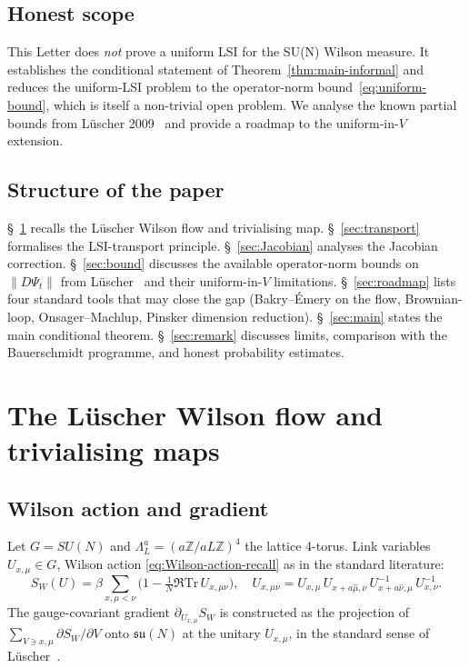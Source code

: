\documentclass[11pt,a4paper]{amsart}
\theoremstyle{definition}
\newcommand{\Z}{\mathbb{Z}}
\newcommand{\su}{\mathfrak{su}}
\newcommand{\norm}[1]{\left\lVert#1\right\rVert}
\newcommand{\Tr}{\mathrm{Tr}}
\begin{document}
\subsection{Honest scope}
\label{sec:scope}
This Letter does \emph{not} prove a uniform LSI for the SU(N) Wilson
measure. It establishes the conditional statement of
Theorem~\ref{thm:main-informal} and reduces the uniform-LSI problem to
the operator-norm bound~\eqref{eq:uniform-bound}, which is itself a
non-trivial open problem. We analyse the known partial bounds from
L\"uscher 2009~\cite{Luscher2009TrivializingMaps} and provide a roadmap
to the uniform-in-$V$ extension.

\subsection{Structure of the paper}
\S~\ref{sec:luescher} recalls the L\"uscher Wilson flow and trivialising
map. \S~\ref{sec:transport} formalises the LSI-transport principle.
\S~\ref{sec:Jacobian} analyses the Jacobian correction.
\S~\ref{sec:bound} discusses the available operator-norm bounds on
$\norm{D\Psi_t}$ from L\"uscher~\cite{Luscher2009TrivializingMaps} and
their uniform-in-$V$ limitations. \S~\ref{sec:roadmap} lists four
standard tools that may close the gap (Bakry--\'Emery on the flow,
Brownian-loop, Onsager--Machlup, Pinsker dimension reduction).
\S~\ref{sec:main} states the main conditional theorem.
\S~\ref{sec:remark} discusses limits, comparison with the Bauerschmidt
programme, and honest probability estimates.

\section{The L\"uscher Wilson flow and trivialising maps}\label{sec:luescher}

\subsection{Wilson action and gradient}
Let $G = SU(N)$ and $\Lambda_L^a = (a\Z/aL\Z)^4$ the lattice 4-torus.
Link variables $U_{x,\mu}\in G$, Wilson action
\eqref{eq:Wilson-action-recall} as in the standard literature:
\begin{equation}\label{eq:Wilson-action-recall}
S_W(U) = \beta \sum_{x,\mu<\nu}
  \bigl(1 - \tfrac{1}{N}\Re\Tr\, U_{x,\mu\nu}\bigr),
\quad
U_{x,\mu\nu} = U_{x,\mu}\,U_{x+a\hat\mu,\nu}\,
  U_{x+a\hat\nu,\mu}^{-1}\,U_{x,\nu}^{-1}.
\end{equation}
The gauge-covariant gradient $\partial_{U_{x,\mu}} S_W$ is constructed
as the projection of $\sum_{V\ni x,\mu} \partial S_W/\partial V$ onto
$\su(N)$ at the unitary $U_{x,\mu}$, in the standard sense of
L\"uscher~\cite[Eq.~(1.2)]{Luscher2010WilsonFlow}.
\end{document}
